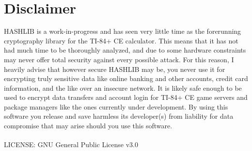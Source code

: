 \documentclass[titlepage]{article}
\begin{document}
				\section{Disclaimer}
					HASHLIB is a work-in-progress and has seen very little time as the forerunning cryptography library for the TI-84+ CE calculator. This means that it has not had much time to be thoroughly analyzed, and due to some hardware constraints may never offer total security against every possible attack. For this reason, I heavily advise that however secure HASHLIB may be, you never use it for encrypting truly sensitive data like online banking and other accounts, credit card information, and the like over an insecure network. It is likely safe enough to be used to encrypt data transfers and account login for TI-84+ CE game servers and package managers like the ones currently under development. By using this software you release and save harmless its developer(s) from liability for data compromise that may arise should you use this software.\\\\
					
					LICENSE: GNU General Public License v3.0
	
\end{document}
